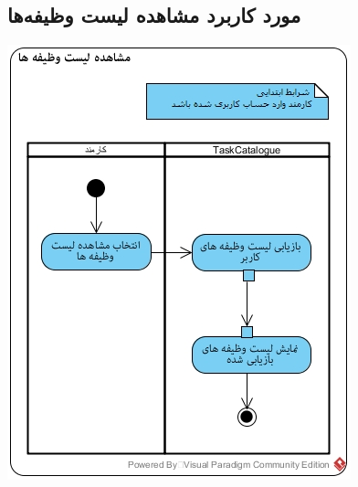 \subsection*{مورد کاربرد مشاهده لیست وظیفه‌ها}
\vspace{2cm}
\begin{center}
\includegraphics[width=\textwidth]{ActivityDiagramsWithSwimlanes/29.jpg}
\end{center}

\newpage
\vspace{2cm}

